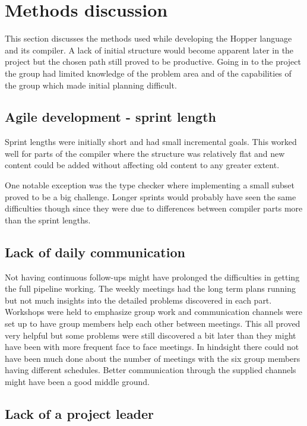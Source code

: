 \section{Methods discussion}

This section discusses the methods used while developing the Hopper language and its compiler. A lack of initial structure would become apparent later in the project but the chosen path still proved to be productive. Going in to the project the group had limited knowledge of the problem area and of the capabilities of the group which made initial planning difficult.

\subsection{Agile development - sprint length}

Sprint lengths were initially short and had small incremental goals. This worked well for parts of the compiler where the structure was relatively flat and new content could be added without affecting old content to any greater extent. 

One notable exception was the type checker where implementing a small subset proved to be a big challenge. Longer sprints would probably have seen the same difficulties though since they were due to differences between compiler parts more than the sprint lengths.

\subsection{Lack of daily communication}

Not having continuous follow-ups might have prolonged the difficulties in getting the full pipeline working. The weekly meetings had the long term plans running but not much insights into the detailed problems discovered in each part. Workshops were held to emphasize group work and communication channels were set up to have group members help each other between meetings. This all proved very helpful but some problems were still discovered a bit later than they might have been with more frequent face to face meetings. In hindsight there could not have been much done about the number of meetings with the six group members having different schedules. Better communication through the supplied channels might have been a good middle ground.

\subsection{Lack of a project leader}

